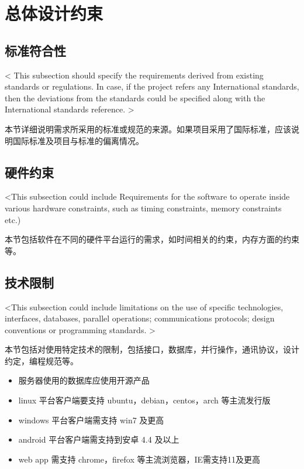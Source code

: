 \chapter{总体设计约束}

 
\section{标准符合性}
< This subsection should specify the requirements derived from existing standards or regulations. In case, if the project refers any International standards, then the deviations from the standards could be specified along with the International standards reference. >

本节详细说明需求所采用的标准或规范的来源。如果项目采用了国际标准，应该说明国际标准及项目与标准的偏离情况。

\section{硬件约束}
<This subsection could include Requirements for the software to operate inside various hardware constraints, such as timing constraints, memory constraints etc.)

本节包括软件在不同的硬件平台运行的需求，如时间相关的约束，内存方面的约束等。


\section{技术限制}
<This subsection could include limitations on the use of specific technologies, interfaces, databases, parallel operations; communications protocols; design conventions or programming standards. >

本节包括对使用特定技术的限制，包括接口，数据库，并行操作，通讯协议，设计约定，编程规范等。

\begin{itemize}
    \item 服务器使用的数据库应使用开源产品
    \item linux 平台客户端要支持 ubuntu，debian，centos，arch 等主流发行版
    \item windows 平台客户端需支持 win7 及更高
    \item android 平台客户端需支持到安卓 4.4 及以上
    \item web app 需支持 chrome，firefox 等主流浏览器，IE需支持11及更高
    \end{itemize}
